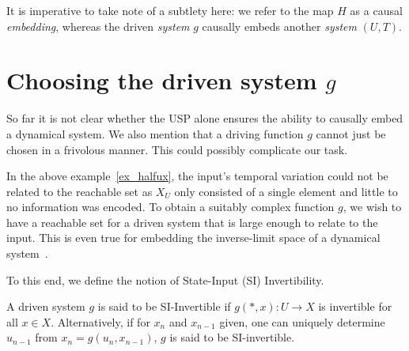 It is imperative to take note of a subtlety here: we refer to the map $H$ as a causal \textit{embedding}, whereas the driven \textit{system} $g$ causally embeds another \emph{system} $(U,T)$.

\section{Choosing the driven system $g$}

So far it is not clear whether the USP alone ensures the ability to causally embed a dynamical system.
We also mention that a driving function $g$ cannot just be chosen in a frivolous manner. 
This could possibly complicate our task. %





In the above example~\ref{ex_halfux}, the input's temporal variation could not be related to the reachable set as $X_U$ only consisted of a single element and little to no information was encoded.
To obtain a suitably complex function $g$, we wish to have a reachable set for a driven system  that is large enough to relate to the input. 
This is even true for embedding  the inverse-limit space of a dynamical system~\cite{manjunath2021universal}. 

 To this end, we define the notion of State-Input (SI) Invertibility.  

\begin{Definition}
  [\bf SI-Invertibility]\label{Dfn_SIinv}\rm
  A driven system $g$ is said to be SI-Invertible if ${g(*,x): U \to X}$ is invertible for all $x\in X$. Alternatively, if for  $x_n$ and $x_{n-1}$ given, one can uniquely determine $u_{n-1}$ from $x_n=g(u_n,x_{n-1})$, $g$ is said to be SI-invertible.
\end{Definition}

